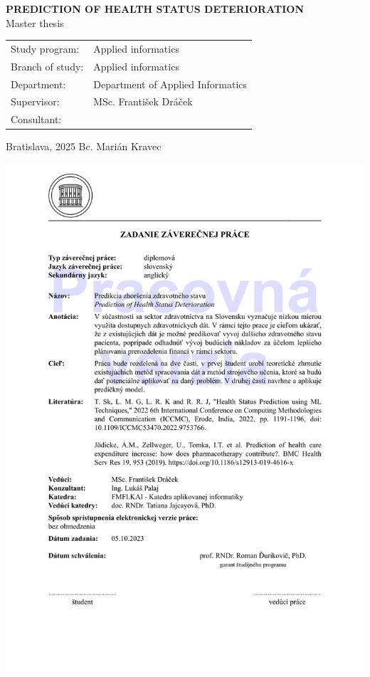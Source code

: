 \documentclass[12pt, twoside, openany]{book}
\def\mftitle{Prediction of health status deterioration} %
\def\mfthesistype{Master thesis}
\def\mfauthor{Bc. Marián Kravec}
\def\mfskolitel{MSc. František Dráček}
\def\mfkonzultant{}
\def\mfplacedate{Bratislava, 2025}
\def\mfodbor{Applied informatics}
\def\program{Applied informatics}
\def\mfpracovisko{Department of Applied Informatics }
\begin{document}
\begin{center}
	\textbf{\MakeUppercase{\Large\mftitle}}\\
	\mfthesistype
\end{center}
\vfill


\begin{tabular}{l l}
Study program: & \program \\
Branch of study: & \mfodbor \\
Department: & \mfpracovisko \\
Supervisor: & \mfskolitel \\
Consultant: & \mfkonzultant \\
\end{tabular}

\vfill
\noindent
\mfplacedate \hfill
\mfauthor
\cleardoublepage




\newpage 
\thispagestyle{empty}
\hspace{-2cm}\includegraphics[page=1,width=1\textwidth]{zadaniePrace.PDF}
\end{document}
